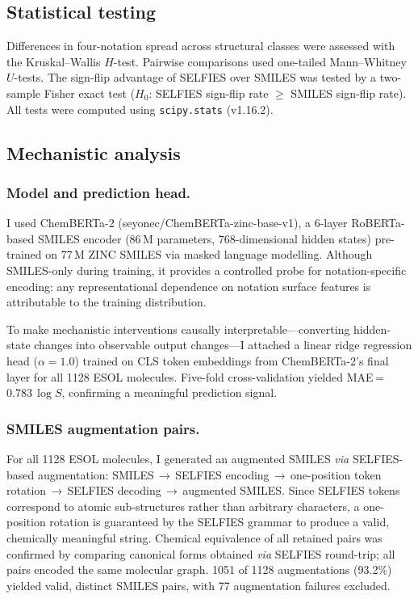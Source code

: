 \documentclass[twoside,twocolumn,9pt]{article}
\newcommand{\logS}{\ensuremath{\log S}}
\begin{document}
\subsection{Statistical testing}

Differences in four-notation spread across structural classes were assessed with the Kruskal--Wallis $H$-test. Pairwise comparisons used one-tailed Mann--Whitney $U$-tests. The sign-flip advantage of SELFIES over SMILES was tested by a two-sample Fisher exact test ($H_0$: SELFIES sign-flip rate $\geq$ SMILES sign-flip rate). All tests were computed using \texttt{scipy.stats} (v1.16.2).

\subsection{Mechanistic analysis}

\subsubsection{Model and prediction head.~~} I used ChemBERTa-2 (seyonec/ChemBERTa-zinc-base-v1),\cite{ahmad2022} a 6-layer RoBERTa-based SMILES encoder (86\,M parameters, 768-dimensional hidden states) pre-trained on 77\,M ZINC SMILES\cite{irwin2012} via masked language modelling. Although SMILES-only during training, it provides a controlled probe for notation-specific encoding: any representational dependence on notation surface features is attributable to the training distribution.

To make mechanistic interventions causally interpretable---converting hidden-state changes into observable output changes---I attached a linear ridge regression head ($\alpha=1.0$) trained on CLS token embeddings from ChemBERTa-2's final layer for all 1128 ESOL molecules. Five-fold cross-validation yielded MAE\,=\,0.783\,$\logS$, confirming a meaningful prediction signal.

\subsubsection{SMILES augmentation pairs.~~} For all 1128 ESOL molecules, I generated an augmented SMILES \textit{via} SELFIES-based augmentation: SMILES\,$\to$\,SELFIES encoding\,$\to$\,one-position token rotation\,$\to$\,SELFIES decoding\,$\to$\,augmented SMILES. Since SELFIES tokens correspond to atomic sub-structures rather than arbitrary characters, a one-position rotation is guaranteed by the SELFIES grammar to produce a valid, chemically meaningful string. Chemical equivalence of all retained pairs was confirmed by comparing canonical forms obtained \textit{via} SELFIES round-trip; all pairs encoded the same molecular graph. 1051 of 1128 augmentations (93.2\%) yielded valid, distinct SMILES pairs, with 77 augmentation failures excluded.
\end{document}

